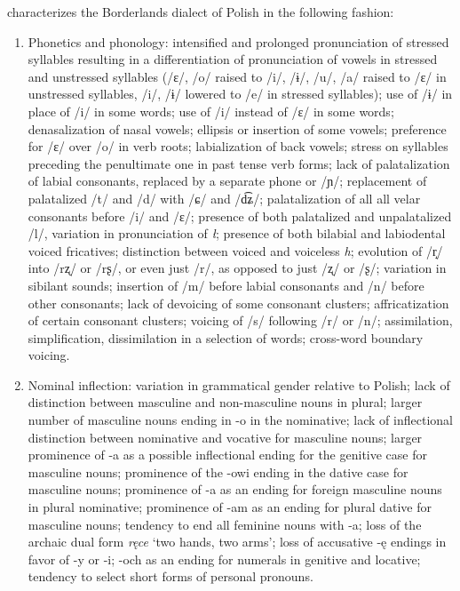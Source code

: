 \citet{kurzowa_1983} characterizes the Borderlands dialect of Polish in the following fashion:
\begin{enumerate}
    \item Phonetics and phonology: intensified and prolonged pronunciation of stressed syllables resulting in a differentiation of pronunciation of vowels in stressed and unstressed syllables (/ɛ/, /o/ raised to /i/, /ɨ/, /u/, /a/ raised to /ɛ/ in unstressed syllables, /i/, /ɨ/ lowered to /e/ in stressed syllables); use of /ɨ/ in place of /i/ in some words; use of /i/ instead of /ɛ/ in some words; denasalization of nasal vowels; ellipsis or insertion of some vowels; preference for /ɛ/ over /o/ in verb roots; labialization of back vowels; stress on syllables preceding the penultimate one in past tense verb forms; lack of palatalization of labial consonants, replaced by a separate phone or /ɲ/; replacement of palatalized /t/ and /d/ with /ɕ/ and /d͡ʑ/; palatalization of all all velar consonants before /i/ and /ɛ/; presence of both palatalized and unpalatalized /l/, variation in pronunciation of \textit{ł}; presence of both bilabial and labiodental voiced fricatives; distinction between voiced and voiceless \textit{h}; evolution of /r̝/ into /rʐ/ or /rʂ/, or even just /r/, as opposed to just /ʐ/ or /ʂ/; variation in sibilant sounds; insertion of /m/ before labial consonants and /n/ before other consonants; lack of devoicing of some consonant clusters; affricatization of certain consonant clusters; voicing of /s/ following /r/ or /n/; assimilation, simplification, dissimilation in a selection of words; cross-word boundary voicing.
    
    \item Nominal inflection: variation in grammatical gender relative to Polish; lack of distinction between masculine and non-masculine nouns in plural; larger number of masculine nouns ending in -o in the nominative; lack of inflectional distinction between nominative and vocative for masculine nouns; larger prominence of -a as a possible inflectional ending for the genitive case for masculine nouns; prominence of the -owi ending in the dative case for masculine nouns; prominence of -a as an ending for foreign masculine nouns in plural nominative; prominence of -am as an ending for plural dative for masculine nouns; tendency to end all feminine nouns with -a; loss of the archaic dual form \textit{ręce} `two hands, two arms'; loss of accusative -ę endings in favor of -y or -i; -och as an ending for numerals in genitive and locative; tendency to select short forms of personal pronouns.
    

\end{enumerate}
